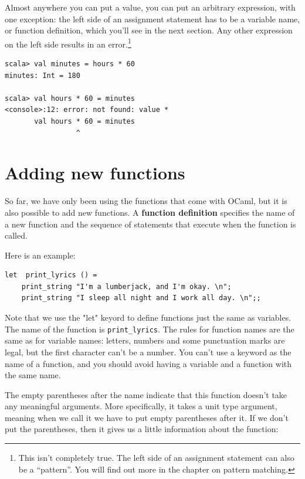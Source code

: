 \documentclass[10pt]{book}
\begin{document}
Almost anywhere you can put a value, you can put an arbitrary
expression, with one exception: the left side of an assignment
statement has to be a variable name, or function definition, which
you'll see in the next section.  Any other expression on the left
side results in an error.\footnote{This isn't completely true. The left side of an assignment
statement can also be a ``pattern''. You will find out more in the chapter on pattern
matching.}

\beforeverb
\begin{verbatim}
scala> val minutes = hours * 60
minutes: Int = 180

scala> val hours * 60 = minutes
<console>:12: error: not found: value *
       val hours * 60 = minutes
                 ^
\end{verbatim}
\afterverb

\section{Adding new functions}

So far, we have only been using the functions that come with OCaml,
but it is also possible to add new functions.
A {\bf function definition} specifies the name of a new function and
the sequence of statements that execute when the function is called.


Here is an example:

\beforeverb
\begin{verbatim}
let  print_lyrics () = 
    print_string "I'm a lumberjack, and I'm okay. \n";
    print_string "I sleep all night and I work all day. \n";;
\end{verbatim}
\afterverb
%
Note that we use the "let" keyord to define functions just the same as
variables. The name of the function is \verb"print_lyrics".  The
rules for function names are the same as for variable names: letters,
numbers and some punctuation marks are legal, but the first character
can't be a number.  You can't use a keyword as the name of a function,
and you should avoid having a variable and a function with the same
name.


The empty parentheses after the name indicate that this function
doesn't take any meaningful arguments. More specifically, it takes a unit type
argument, meaning when we call it we have to put empty parentheses after it.
If we don't put the parentheses, then it gives us a little information about
the function:
\end{document}
